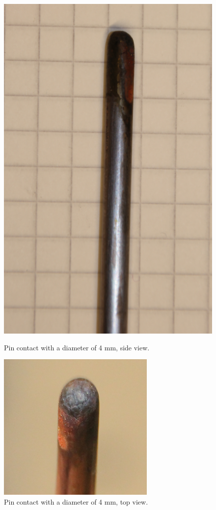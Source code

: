 \documentclass[10pt,a4paper,twoside]{article}
\begin{document}
\begin{figure}[H]
\centering
\begin{minipage}{.5\textwidth}
  \centering
  \includegraphics[scale=0.21]{Bilder/Discussion/d4_630and400_burn.png}
  \caption{Pin contact with a diameter of 4 mm, \newline side view.}
  \label{fig:d4_burn_side}
\end{minipage}%
\begin{minipage}{.5\textwidth}
  \centering
  \includegraphics[scale=0.54]{Bilder/Discussion/d4_630and400_top_burn.png}
  \caption{Pin contact with a diameter of 4 mm, \newline top view.}
  \label{fig:d4_burn_top}
\end{minipage}
\end{figure}
\end{document}
